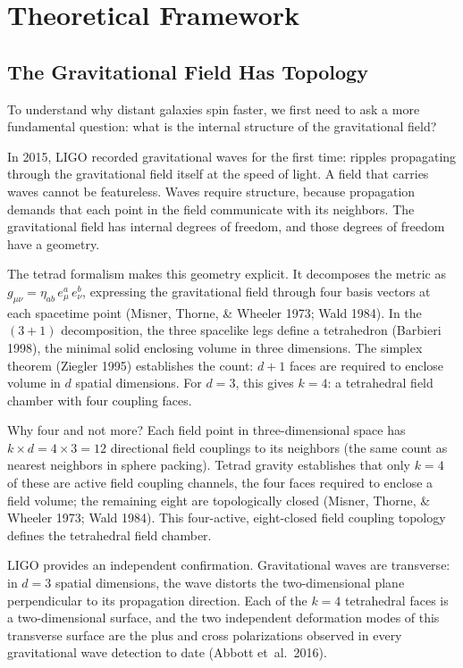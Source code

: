 \documentclass[aps,prd,preprint,superscriptaddress,showpacs,preprintnumbers,amsmath,amssymb,nofootinbib]{revtex4-2}
\begin{document}
\section{Theoretical Framework}
\label{sec:theory}

\subsection{The Gravitational Field Has Topology}
\label{subsec:topology}

To understand why distant galaxies spin faster, we first need to ask a more fundamental question: what is the internal structure of the gravitational field?

In 2015, LIGO recorded gravitational waves for the first time: ripples propagating through the gravitational field itself at the speed of light. A field that carries waves cannot be featureless. Waves require structure, because propagation demands that each point in the field communicate with its neighbors. The gravitational field has internal degrees of freedom, and those degrees of freedom have a geometry.

The tetrad formalism makes this geometry explicit. It decomposes the metric as $g_{\mu\nu} = \eta_{ab}\,e^a_\mu\,e^b_\nu$, expressing the gravitational field through four basis vectors at each spacetime point (Misner, Thorne, \& Wheeler 1973; Wald 1984). In the $(3{+}1)$ decomposition, the three spacelike legs define a tetrahedron (Barbieri 1998), the minimal solid enclosing volume in three dimensions. The simplex theorem (Ziegler 1995) establishes the count: $d + 1$ faces are required to enclose volume in $d$ spatial dimensions. For $d = 3$, this gives $k = 4$: a tetrahedral field chamber with four coupling faces.

Why four and not more? Each field point in three-dimensional space has $k \times d = 4 \times 3 = 12$ directional field couplings to its neighbors (the same count as nearest neighbors in sphere packing). Tetrad gravity establishes that only $k = 4$ of these are active field coupling channels, the four faces required to enclose a field volume; the remaining eight are topologically closed (Misner, Thorne, \& Wheeler 1973; Wald 1984). This four-active, eight-closed field coupling topology defines the tetrahedral field chamber.

LIGO provides an independent confirmation. Gravitational waves are transverse: in $d = 3$ spatial dimensions, the wave distorts the two-dimensional plane perpendicular to its propagation direction. Each of the $k = 4$ tetrahedral faces is a two-dimensional surface, and the two independent deformation modes of this transverse surface are the plus and cross polarizations observed in every gravitational wave detection to date (Abbott et~al.\ 2016).
\end{document}
